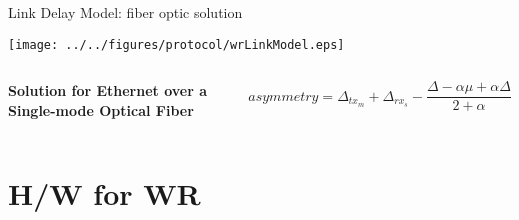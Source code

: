 \documentclass[compress,red]{beamer}
\begin{document}
\begin{frame}{Link Delay Model: fiber optic solution}

  \begin{center}
  \texttt{[image: ../../figures/protocol/wrLinkModel.eps]}
  \end{center}

  \begin{columns}[c]
  \column{1.5in}

    \begin{center}
      \textbf{Solution for Ethernet over a Single-mode Optical Fiber}
    \end{center}    

  \column{2.7in}

    \begin{equation}
      \nonumber asymmetry = \Delta_{tx_m} + \Delta_{rx_s} - \frac{\Delta - \alpha \mu + \alpha \Delta}{2 + \alpha}
    \end{equation}

  \end{columns}

\end{frame}
% 
% 
\section{H/W for WR}
\end{document}
